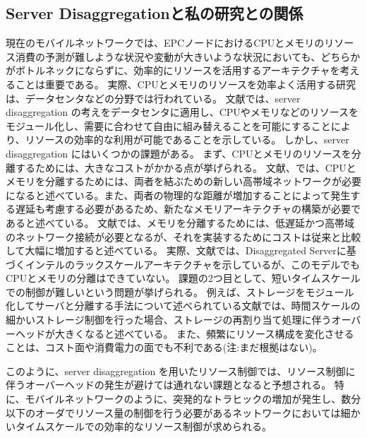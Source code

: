 \documentclass[a4j]{ujarticle}
\begin{document}
\subsection{Server Disaggregationと私の研究との関係}
現在のモバイルネットワークでは、EPCノードにおけるCPUとメモリのリソース消費の予測が難しような状況や変動が大きいような状況においても、どちらかがボトルネックにならずに、効率的にリソースを活用するアーキテクチャを考えることは重要である。
実際、CPUとメモリのリソースを効率よく活用する研究は、データセンタなどの分野では行われている。
文献\cite{TechnoEconomicFrameworkforCloudInfrastructureACostStudyofResourceDisaggregation}では、server disaggregation の考えをデータセンタに適用し、CPUやメモリなどのリソースをモジュール化し、需要に合わせて自由に組み替えることを可能にすることにより、リソースの効率的な利用が可能であることを示している。
しかし、server disaggregation にはいくつかの課題がある。
まず、CPUとメモリのリソースを分離するためには、大きなコストがかかる点が挙げられる。
文献\cite{IntelsDisaggregatedServerRack}、\cite{EnhancedBackoffTimerSolutionforGTPCOverloadControl}では、CPUとメモリを分離するためには、両者を結ぶための新しい高帯域ネットワークが必要になると述べている。また、両者の物理的な距離が増加することによって発生する遅延も考慮する必要があるため、新たなメモリアーキテクチャの構築が必要であると述べている。
文献\cite{DisaggregatedandOpticallyInterconnectedMemoryWhenwillitbecosteffective}では、メモリを分離するためには、低遅延かつ高帯域のネットワーク接続が必要となるが、それを実装するためにコストは従来と比較して大幅に増加すると述べている。
実際、文献\cite{DisaggregatedServersDriveDataCenterEfficiencyandInnovation}では、Disaggregated Serverに基づくインテルのラックスケールアーキテクチャを示しているが、このモデルでもCPUとメモリの分離はできていない。
課題の2つ目として、短いタイムスケールでの制御が難しいという問題が挙げられる。
例えば、ストレージをモジュール化してサーバと分離する手法について述べられている文献\cite{UnderstandingRackScaleDisaggregatedStorage}では、時間スケールの細かいストレージ制御を行った場合、ストレージの再割り当て処理に伴うオーバーヘッドが大きくなると述べている。
また、頻繁にリソース構成を変化させることは、コスト面や消費電力の面でも不利である(注:まだ根拠はない)。

このように、server disaggregation を用いたリソース制御では、リソース制御に伴うオーバーヘッドの発生が避けては通れない課題となると予想される。
特に、モバイルネットワークのように、突発的なトラヒックの増加が発生し、数分以下のオーダでリソース量の制御を行う必要があるネットワークにおいては細かいタイムスケールでの効率的なリソース制御が求められる。
\end{document}
